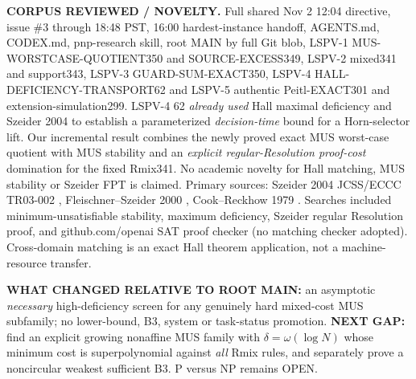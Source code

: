 \documentclass[11pt]{article}
\begin{document}
\noindent\textbf{CORPUS REVIEWED / NOVELTY.} Full shared Nov 2 12:04 directive, issue \#3 through 18:48 PST, 16:00 hardest-instance handoff, AGENTS.md, CODEX.md, pnp-research skill, root MAIN by full Git blob, LSPV-1 MUS-WORSTCASE-QUOTIENT350 and SOURCE-EXCESS349, LSPV-2 mixed341 and support343, LSPV-3 GUARD-SUM-EXACT350, LSPV-4 HALL-DEFICIENCY-TRANSPORT62 and LSPV-5 authentic Peitl-EXACT301 and extension-simulation299. LSPV-4 62 \emph{already used} Hall maximal deficiency and Szeider 2004 to establish a parameterized \emph{decision-time} bound for a Horn-selector lift. Our incremental result combines the newly proved exact MUS worst-case quotient with MUS stability and an \emph{explicit regular-Resolution proof-cost} domination for the fixed Rmix341. No academic novelty for Hall matching, MUS stability or Szeider FPT is claimed. Primary sources: Szeider 2004 JCSS/ECCC TR03-002 \cite{Szeider2004}, Fleischner--Szeider 2000 \cite{FleischnerSzeider2000}, Cook--Reckhow 1979 \cite{CookReckhow1979}. Searches included minimum-unsatisfiable stability, maximum deficiency, Szeider regular Resolution proof, and github.com/openai SAT proof checker (no matching checker adopted). Cross-domain matching is an exact Hall theorem application, not a machine-resource transfer.

\noindent\textbf{WHAT CHANGED RELATIVE TO ROOT MAIN:} an asymptotic \emph{necessary} high-deficiency screen for any genuinely hard mixed-cost MUS subfamily; no lower-bound, B3, system or task-status promotion. \textbf{NEXT GAP:} find an explicit growing nonaffine MUS family with $\delta=\omega(\log N)$ whose minimum cost is superpolynomial against \emph{all} Rmix rules, and separately prove a noncircular weakest sufficient B3. P versus NP remains OPEN.


\end{document}
